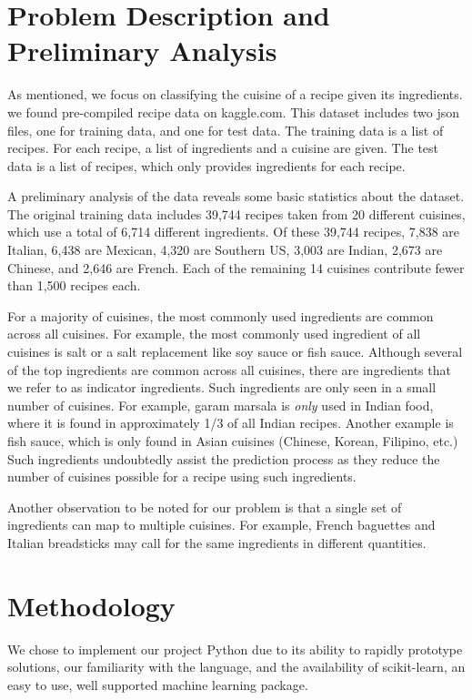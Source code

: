 \documentclass[11pt]{article}
\begin{document}
\section{Problem Description and Preliminary Analysis}
As mentioned, we focus on classifying the cuisine of a recipe given
its ingredients.  we found pre-compiled recipe data on kaggle.com.
This dataset includes two json files, one for training data, and one
for test data.  The training data is a list of recipes.  For each
recipe, a list of ingredients and a cuisine are given.  The test data
is a list of recipes, which only provides ingredients for each
recipe. 

A preliminary analysis of the data reveals some basic statistics about
the dataset.  The original training data includes 39,744 recipes taken
from 20 different cuisines, which use a total of 6,714 different
ingredients.  Of these 39,744 recipes, 7,838 are Italian, 6,438 are
Mexican, 4,320 are Southern US, 3,003 are Indian, 2,673 are Chinese,
and 2,646 are French.  Each of the remaining 14 cuisines contribute
fewer than 1,500 recipes each.

For a majority of cuisines, the most commonly used ingredients are
common across all cuisines.  For example, the most commonly used
ingredient of all cuisines is salt or a salt replacement like soy
sauce or fish sauce.  Although several of the top ingredients are
common across all cuisines, there are ingredients that we refer to as
indicator ingredients.  Such ingredients are only seen in a small
number of cuisines.  For example, garam marsala is \emph{only} used in
Indian food, where it is found in approximately 1/3 of all Indian
recipes.  Another example is fish sauce, which is only found in Asian
cuisines (Chinese, Korean, Filipino, etc.) Such ingredients
undoubtedly assist the prediction process as they reduce 
the number of cuisines possible for a recipe using such ingredients.  

Another observation to be noted for our problem is that a single set of
ingredients can map to multiple cuisines.  For example, French
baguettes and Italian breadsticks may call for the same ingredients in
different quantities.


\section{Methodology}
We chose to implement our project Python due to its ability to rapidly
prototype solutions, our familiarity with the language, and the
availability of scikit-learn, an easy to use, well supported machine
learning package.  
\end{document}
